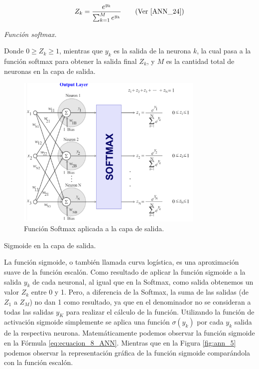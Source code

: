 \documentclass[12pt,a4paper]{article}
\makeatletter
\renewcommand\paragraph{\@startsection{paragraph}{4}{\z@}
            {-2.5ex\@plus -1ex \@minus -.25ex}
            {1.25ex \@plus .25ex}
            {\normalfont\normalsize\bfseries}}
\makeatother
\begin{document}
\begin{sloppypar}
\begin{equation}\label{eq:ecuacion_7_ANN}
Z_k= \frac{e^{y_k}}{\sum_{k=1}^{M}e^{y_k}} \qquad \text{(Ver \cite{ANN_24})}
\end{equation}
\begin{center}
\textit{Función softmax.}
\end{center}

Donde $0 \geq Z_k \geq 1$, mientras que $y_k$ es la salida de la neurona $k$, la cual pasa a la función softmax para obtener la salida final $Z_k$, y $M$ es la cantidad total de neuronas en la capa de salida.     

\begin{figure}[H]    %
\centering
\includegraphics[width=0.8\textwidth]{images/ANN/4-ANN.png}
\caption[Función Softmax aplicada a la capa de salida.]{Función Softmax aplicada a la capa de salida\protect\footnotemark .}
 \label{fig:ann_4}
\end{figure}

\paragraph{Sigmoide en la capa de salida.}\label{sigm_capa_salida}

La función sigmoide, o también llamada curva logística, es una aproximación suave de la función escalón. Como resultado de aplicar la función sigmoide a la salida $y_k$ de cada neuronal, al igual que en la Softmax, como salida obtenemos un valor $Z_k$ entre 0 y 1. Pero, a diferencia de la Softmax, la suma de las salidas (de $Z_1$ a $Z_M$) no dan 1 como resultado, ya que en el denominador no se consideran a todas las salidas $y_K$ para realizar el cálculo de la función. Utilizando la función de activación sigmoide simplemente se aplica una función $\sigma(y_k)$ por cada $y_k$ salida de la respectiva neurona. Matemáticamente podemos observar la función sigmoide en la Fórmula \ref{eq:ecuacion_8_ANN}. 
Mientras que en la Figura \ref{fig:ann_5} podemos observar la representación gráfica de la función sigmoide comparándola con la función escalón. 


\end{sloppypar}
\end{document}
